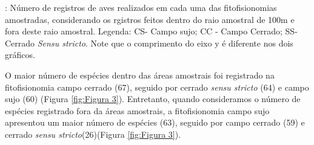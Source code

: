 : Número de registros de aves realizados em cada uma das fitofisionomias amostradas, considerando os rgistros feitos dentro do raio amostral de 100m e fora deste raio amostral. Legenda: CS- Campo sujo; CC -  Campo Cerrado; SS- Cerrado \textit{Sensu stricto}. Note que o comprimento do eixo y é diferente nos dois gráficos.

O maior número de espécies dentro das áreas amostrais foi registrado na fitofisionomia campo cerrado (67), seguido por cerrado \textit{sensu stricto} (64) e campo sujo (60) (Figura \ref{fig:Figura 3}). Entretanto, quando consideramos o número de espécies registrado fora da áreas amostrais, a fitofisionomia campo sujo apresentou um maior número de espécies (63), seguido por campo cerrado (59) e cerrado \textit{sensu stricto}(26)(Figura \ref{fig:Figura 3}).
